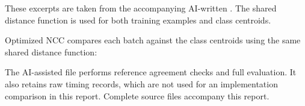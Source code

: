 These excerpts are taken from the accompanying AI-written .
The shared distance function is used for both training examples and class
centroids.
\par\noindent\begin{minipage}{\linewidth}

\end{minipage}\par
\par\noindent\begin{minipage}{\linewidth}

\end{minipage}\par
\par\noindent\begin{minipage}{\linewidth}

\end{minipage}\par

Optimized NCC compares each batch against the class centroids using the
same shared distance function:
\par\noindent\begin{minipage}{\linewidth}

\end{minipage}\par

The AI-assisted file  performs reference agreement
checks and full evaluation. It also retains raw timing records, which are
not used for an implementation comparison in this report. Complete source
files accompany this report.
